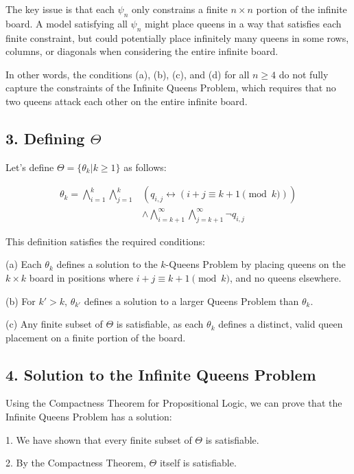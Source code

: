 \documentclass{article}
\begin{document}
The key issue is that each $\psi_n$ only constrains a finite $n \times n$ portion of the infinite board. A model satisfying all $\psi_n$ might place queens in a way that satisfies each finite constraint, but could potentially place infinitely many queens in some rows, columns, or diagonals when considering the entire infinite board.

In other words, the conditions (a), (b), (c), and (d) for all $n \geq 4$ do not fully capture the constraints of the Infinite Queens Problem, which requires that no two queens attack each other on the entire infinite board.

\newpage

\subsection*{3. Defining $\Theta$}

Let's define $\Theta = \{\theta_k | k \geq 1\}$ as follows:

\begin{align*}
\theta_k = \bigwedge_{i=1}^k \bigwedge_{j=1}^k &\left(q_{i,j} \leftrightarrow (i+j \equiv k+1 \pmod{k})\right) \\
&\wedge \bigwedge_{i=k+1}^\infty \bigwedge_{j=k+1}^\infty \neg q_{i,j}
\end{align*}

This definition satisfies the required conditions:

(a) Each $\theta_k$ defines a solution to the $k$-Queens Problem by placing queens on the $k \times k$ board in positions where $i+j \equiv k+1 \pmod{k}$, and no queens elsewhere.

(b) For $k' > k$, $\theta_{k'}$ defines a solution to a larger Queens Problem than $\theta_k$.

(c) Any finite subset of $\Theta$ is satisfiable, as each $\theta_k$ defines a distinct, valid queen placement on a finite portion of the board.
\newpage


\subsection*{4. Solution to the Infinite Queens Problem}

Using the Compactness Theorem for Propositional Logic, we can prove that the Infinite Queens Problem has a solution:

1. We have shown that every finite subset of $\Theta$ is satisfiable.

2. By the Compactness Theorem, $\Theta$ itself is satisfiable.
\end{document}
